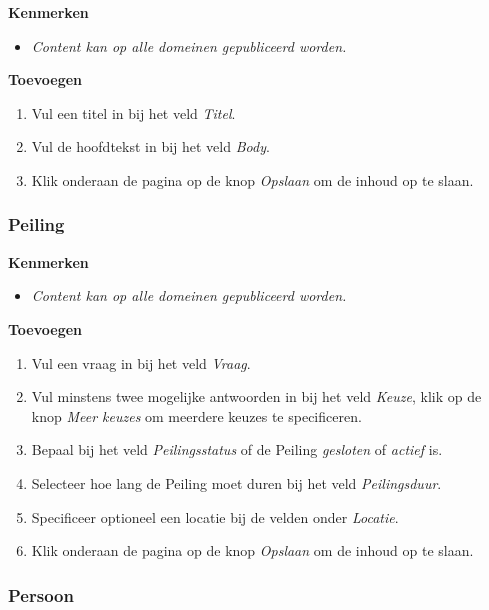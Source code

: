 \textbf{Kenmerken}

\begin{itemize}
\item \emph{Content kan op alle domeinen gepubliceerd worden.}
\end{itemize}

\textbf{Toevoegen}

\begin{enumerate}
\item Vul een titel in bij het veld \emph{Titel}.
\item Vul de hoofdtekst in bij het veld \emph{Body}.
\item Klik onderaan de pagina op de knop \emph{Opslaan} om de inhoud op te slaan.
\end{enumerate}

\subsubsection{Peiling}\label{peiling}

\textbf{Kenmerken}

\begin{itemize}
\item \emph{Content kan op alle domeinen gepubliceerd worden.}
\end{itemize}

\textbf{Toevoegen}

\begin{enumerate}
\item Vul een vraag in bij het veld \emph{Vraag}.
\item Vul minstens twee mogelijke antwoorden in bij het veld \emph{Keuze}, klik op de knop \emph{Meer keuzes} om meerdere keuzes te specificeren.
\item Bepaal bij het veld \emph{Peilingsstatus} of de Peiling \emph{gesloten} of \emph{actief} is.
\item Selecteer hoe lang de Peiling moet duren bij het veld \emph{Peilingsduur}.
\item Specificeer optioneel een locatie bij de velden onder \emph{Locatie}.
\item Klik onderaan de pagina op de knop \emph{Opslaan} om de inhoud op te slaan.
\end{enumerate}

\subsubsection{Persoon}\label{persoon}


